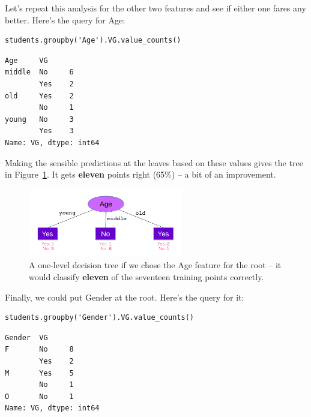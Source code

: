 Let's repeat this analysis for the other two features and see if either one
fares any better. Here's the query for \textsf{Age}:

\begin{Verbatim}[fontsize=\small,samepage=true,frame=single,framesep=3mm]
students.groupby('Age').VG.value_counts()
\end{Verbatim}
\vspace{-.2in}

\begin{Verbatim}[fontsize=\small,samepage=true,frame=leftline,framesep=5mm,framerule=1mm]
Age     VG 
middle  No     6
        Yes    2
old     Yes    2
        No     1
young   No     3
        Yes    3
Name: VG, dtype: int64
\end{Verbatim}

Making the sensible predictions at the leaves based on these values gives the
tree in Figure~\ref{fig:ageOnTop}. It gets \textbf{eleven} points right (65\%)
-- a bit of an improvement.

\begin{figure}[ht]
\centering
\includegraphics[width=0.6\textwidth]{ageOnTop.png}
\caption{A one-level decision tree if we chose the \textsf{Age} feature for the
root -- it would classify \textbf{eleven} of the seventeen training points
correctly.}
\label{fig:ageOnTop}
\end{figure}

Finally, we could put \textsf{Gender} at the root. Here's the query for it:

\begin{samepage}
\begin{Verbatim}[fontsize=\small,samepage=true,frame=single,framesep=3mm]
students.groupby('Gender').VG.value_counts()
\end{Verbatim}
\vspace{-.2in}

\begin{Verbatim}[fontsize=\small,samepage=true,frame=leftline,framesep=5mm,framerule=1mm]
Gender  VG 
F       No     8
        Yes    2
M       Yes    5
        No     1
O       No     1
Name: VG, dtype: int64
\end{Verbatim}
\end{samepage}

